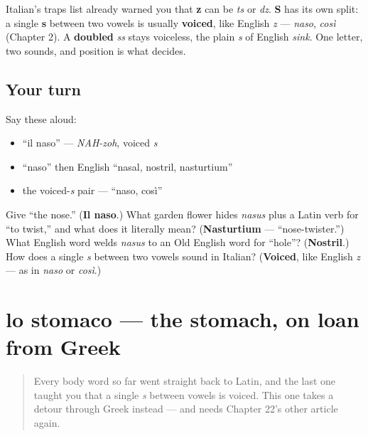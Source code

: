\begin{grammarlens}[title={Grammar Lens: when a single \emph{s} sounds like \emph{z}}]
Italian's traps list already warned you that \textbf{z} can be \emph{ts} or \emph{dz}. \textbf{S} has its own split: a single \textbf{s} between two vowels is usually \textbf{voiced}, like English \emph{z} — \emph{naso}, \emph{così} (Chapter 2). A \textbf{doubled} \emph{ss} stays voiceless, the plain \emph{s} of English \emph{sink}. One letter, two sounds, and position is what decides.
\end{grammarlens}

\subsection*{Your turn}
Say these aloud:

\begin{itemize}
\raggedright
  \item \textquotedblleft{}il naso\textquotedblright{} — \emph{NAH-zoh}, voiced \emph{s}
  \item \textquotedblleft{}naso\textquotedblright{} then English \textquotedblleft{}nasal, nostril, nasturtium\textquotedblright{}
  \item the voiced-\emph{s} pair — \textquotedblleft{}naso, così\textquotedblright{}
\end{itemize}

\begin{tcolorbox}[breakable,colback=teal!4,colframe=teal!35!black,title={Before you move on}]
Give \textquotedblleft{}the nose.\textquotedblright{} (\textbf{Il naso}.) What garden flower hides \emph{nasus} plus a Latin verb for \textquotedblleft{}to twist,\textquotedblright{} and what does it literally mean? (\textbf{Nasturtium} — \textquotedblleft{}nose-twister.\textquotedblright{}) What English word welds \emph{nasus} to an Old English word for \textquotedblleft{}hole\textquotedblright{}? (\textbf{Nostril}.) How does a single \emph{s} between two vowels sound in Italian? (\textbf{Voiced}, like English \emph{z} — as in \emph{naso} or \emph{così}.)
\end{tcolorbox}
\section[lo stomaco]{lo stomaco — the stomach, on loan from Greek}

\label{lesson:IT-C25-stomaco}



\begin{quote}
Every body word so far went straight back to Latin, and the last one taught you that a single \emph{s} between vowels is voiced. This one takes a detour through Greek instead — and needs Chapter 22's other article again.
\end{quote}

